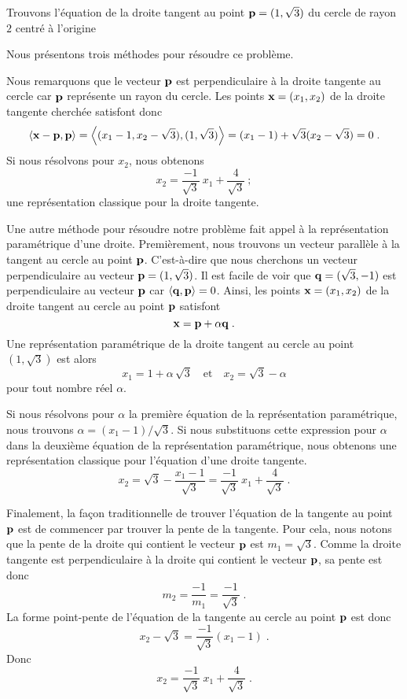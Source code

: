 {\begin{egg}
Trouvons l'équation de la droite tangent au point
$\mathbf{p}= (1,\sqrt{3})$ du cercle de rayon $2$ centré à l'origine

Nous présentons trois méthodes pour résoudre ce problème.

 Nous remarquons que le vecteur $\mathbf{p}$ est perpendiculaire à la
droite tangente au cercle car $\mathbf{p}$ représente un rayon du cercle.
Les points $\mathbf{x}=(x_1,x_2)$ de la droite tangente cherchée
satisfont donc
\[
\left\langle{\mathbf{x} - \mathbf{p}} , {\mathbf{p}}\right\rangle = \left\langle{ (x_1-1, x_2-\sqrt{3})} , {(1,\sqrt{3})}\right\rangle
= (x_1-1) + \sqrt{3} (x_2-\sqrt{3}) = 0 \; .
\]
Si nous résolvons pour $x_2$, nous obtenons
\[
x_2 = \frac{-1}{\sqrt{3}}\ x_1 + \frac{4}{\sqrt{3}} \ ;
\]
une représentation classique pour la droite tangente.

 Une autre méthode pour résoudre notre problème fait appel à
la représentation paramétrique d'une droite.  Premièrement, nous trouvons un
vecteur parallèle à la tangent au cercle au point $\mathbf{p}$.
C'est-à-dire que nous cherchons un vecteur perpendiculaire au vecteur
$\mathbf{p} = (1,\sqrt{3})$.  Il est facile de voir que
$\mathbf{q} = (\sqrt{3}, -1)$ est perpendiculaire au vecteur
$\mathbf{p}$ car $\left\langle{\mathbf{q}} , {\mathbf{p}}\right\rangle = 0$.  Ainsi, les points
$\mathbf{x}=(x_1,x_2)$ de la droite tangent au cercle au point $\mathbf{p}$
satisfont
\[
\mathbf{x} = \mathbf{p} + \alpha \mathbf{q} \; .
\]
Une représentation paramétrique de la droite tangent au cercle au point
$(1,\sqrt{3})$ est alors
\[
x_1 = 1 + \alpha \, \sqrt{3} \quad \text{et} \quad x_2 = \sqrt{3} - \alpha
\]
pour tout nombre réel $\alpha$.

Si nous résolvons pour $\alpha$ la première équation de la représentation
paramétrique, nous trouvons $\alpha = (x_1-1)/\sqrt{3}$.  Si nous
substituons cette expression pour $\alpha$ dans la deuxième équation
de la représentation paramétrique, nous obtenons une représentation
classique pour l'équation d'une droite tangente.
\[
x_2 = \sqrt{3} - \frac{x_1-1}{\sqrt{3}} = \frac{-1}{\sqrt{3}}\ x_1 
+ \frac{4}{\sqrt{3}} \; .
\]

 Finalement, la façon traditionnelle de trouver l'équation de
la tangente au point $\mathbf{p}$ est de commencer par trouver la pente de la
tangente.  Pour cela, nous notons que la pente de la droite qui contient
le vecteur $\mathbf{p}$ est $\displaystyle m_1 = \sqrt{3}$.  Comme la
droite tangente est perpendiculaire à la droite qui contient le
vecteur $\mathbf{p}$, sa pente est donc
\[
m_2 = \frac{-1}{m_1} = \frac{-1}{\sqrt{3}} \; .
\]
La forme point-pente de l'équation de la tangente au cercle au point
$\mathbf{p}$ est donc
\[
x_2 - \sqrt{3} = \frac{-1}{\sqrt{3}} ( x_1 - 1) \; .
\]
Donc
\[
x_2 = \frac{-1}{\sqrt{3}} \ x_1 + \frac{4}{\sqrt{3}}  \; .
\]
\label{TANG_CIRCL}
\end{egg}

}
